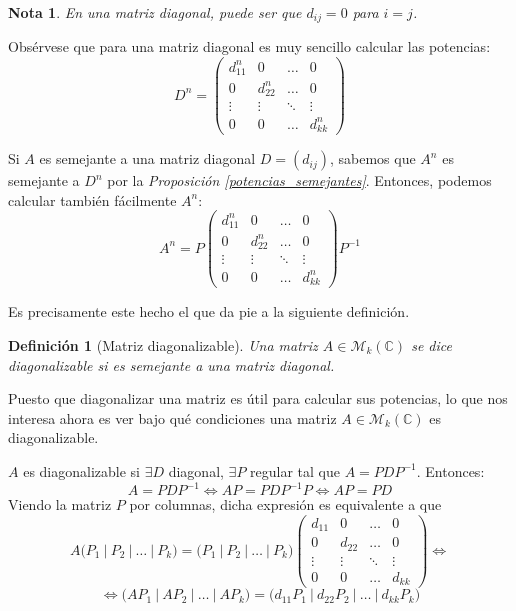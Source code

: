 \documentclass[11pt, a4paper]{article}
\newif\IfInSansMode
\numberwithin{equation}{section}
\theoremstyle{theorem-style}
\theoremstyle{definition-style}
\newtheorem{ndef}{Definición}[section]
\theoremstyle{remark-style}
\newtheorem*{nota}{Nota}
\theoremstyle{example-style}
\begin{document}
\begin{nota} En una matriz diagonal, puede ser que $d_{ij} = 0$ para $i=j$.
	
\end{nota}

Obsérvese que para una matriz diagonal es muy sencillo calcular las potencias: 
$$ D^n = 
\begin{pmatrix}
  d_{11}^n & 0 & \hdots & 0 \\
  0 & d_{22}^n & \hdots & 0 \\
  \vdots & \vdots & \ddots & \vdots \\
  0 & 0 & \hdots & d_{kk}^n
\end{pmatrix}$$

Si $A$ es semejante a una matriz diagonal $D = (d_{ij})$, sabemos que $A^n$ es semejante a $D^n$ por la \textit{Proposición \ref{potencias_semejantes}}. Entonces, podemos calcular también fácilmente $A^n$: $$A^n = P \begin{pmatrix}
  d_{11}^n & 0 & \hdots & 0 \\
  0 & d_{22}^n & \hdots & 0 \\
  \vdots & \vdots & \ddots & \vdots \\
  0 & 0 & \hdots & d_{kk}^n
\end{pmatrix}P^{-1}$$

Es precisamente este hecho el que da pie a la siguiente definición.

\begin{ndef}[Matriz diagonalizable]
  Una matriz $A \in \mathcal M_k(\mathbb C)$ se dice \textit{diagonalizable} si es
  semejante a una matriz diagonal.
\end{ndef}

Puesto que diagonalizar una matriz es útil para calcular sus potencias, lo que nos interesa ahora es ver bajo qué condiciones una matriz $A \in \mathcal M_k (\mathbb C)$ es diagonalizable.

$A$ es diagonalizable si $\exists D$ diagonal, $\exists P$ regular tal que $A = PDP^{-1}$. Entonces: $$A = PDP^{-1} \iff AP = PDP^{-1}P \iff AP = PD$$
Viendo la matriz $P$ por columnas, dicha expresión es equivalente a que $$A\Bigg(  P_1 \ \Big| \ P_2 \ \Big| \ \dots \ \Big| \ P_k \Bigg) = \Bigg(  P_1 \ \Big| \ P_2 \ \Big| \ \dots \ \Big| \ P_k \Bigg) \begin{pmatrix}
  d_{11} & 0 & \hdots & 0 \\
  0 & d_{22} & \hdots & 0 \\
  \vdots & \vdots & \ddots & \vdots \\
  0 & 0 & \hdots & d_{kk}
\end{pmatrix} \iff$$ $$\iff \Bigg(  AP_1 \ \Big| \ AP_2 \ \Big| \ \dots \ \Big| \ AP_k \Bigg) = \Bigg(  d_{11}P_1 \ \Big| \ d_{22}P_2 \ \Big| \ \dots \ \Big| \ d_{kk}P_k \Bigg)$$
\end{document}
